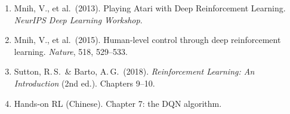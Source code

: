 \documentclass{article}
\begin{document}
\begin{enumerate}
  \item Mnih, V., et al.\ (2013). Playing Atari with Deep Reinforcement Learning. \textit{NeurIPS Deep Learning Workshop}.
  \item Mnih, V., et al.\ (2015). Human-level control through deep reinforcement learning. \textit{Nature}, 518, 529--533.
  \item Sutton, R.\,S.\ \& Barto, A.\,G.\ (2018). \textit{Reinforcement Learning: An Introduction} (2nd ed.). Chapters 9--10.
  \item Hands-on RL (Chinese). Chapter 7: the DQN algorithm.
\end{enumerate}
\end{document}
